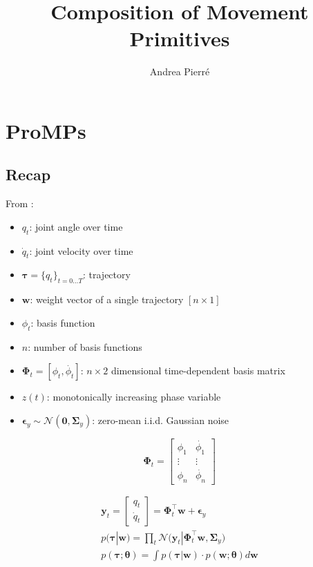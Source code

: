 \documentclass{article}
\title{Composition of Movement Primitives}
\author{Andrea Pierré}
\begin{document}
\maketitle


\tableofcontents

\section{ProMPs}
\subsection{Recap}
From \citep{paraschos_probabilistic_2013, paraschos_using_2018}:
\begin{itemize}
    \item $q_t$: joint angle over time
    \item $\dot{q}_t$: joint velocity over time
    \item $\bm{\tau} = \{q_t\}_{t=0\dots T}$: trajectory
    \item $\bm{w}$: weight vector of a single trajectory $[n \times 1]$
    \item $\phi_t$: basis function
    \item $n$: number of basis functions
    \item $\bm{\Phi}_t = [\phi_t, \dot{\phi_t}]$: $n \times 2$ dimensional time-dependent basis matrix
    \item $z(t)$: monotonically increasing phase variable
    \item $\bm{\epsilon}_y \sim \mathcal{N}(\bm{0}, \bm{\Sigma}_y)$: zero-mean i.i.d. Gaussian noise
\end{itemize}

\begin{equation}
  \bm{\Phi}_t =
  \begin{bmatrix}
    \phi_1 & \dot{\phi_1}\\
    \vdots & \vdots\\
    \phi_n & \dot{\phi_n}
  \end{bmatrix}
\end{equation}

\begin{gather}
\bm{y}_t = \begin{bmatrix}
       q_t \\[0.3em]
       \dot{q}_t
     \end{bmatrix} = \bm{\Phi}^{\top}_{t}\bm{w} + \bm{\epsilon}_y\\
p(\bm{\tau}|\bm{w}) = \prod_t \mathcal{N}\Big(\bm{y}_t|\bm{\Phi}^{\top}_{t}\bm{w}, \bm{\Sigma}_y \Big)\\
p(\bm{\tau};\bm{\theta}) = \int p(\bm{\tau}|\bm{w}) \cdot p(\bm{w};\bm{\theta}) d\bm{w}
\end{gather}
\end{document}

